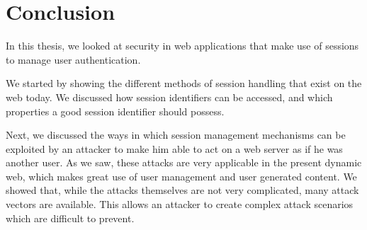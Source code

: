 \chapter{Conclusion}%

In this thesis, we looked at security in web applications that make use of sessions to manage user authentication.

We started by showing the different methods of session handling that exist on the web today. We discussed how session identifiers can be accessed, and which properties a good session identifier should possess.

Next, we discussed the ways in which session management mechanisms can be exploited by an attacker to make him able to act on a web server as if he was another user. As we saw, these attacks are very applicable in the present dynamic web, which makes great use of user management and user generated content. We showed that, while the attacks themselves are not very complicated, many attack vectors are available. This allows an attacker to create complex attack scenarios which are difficult to prevent.

